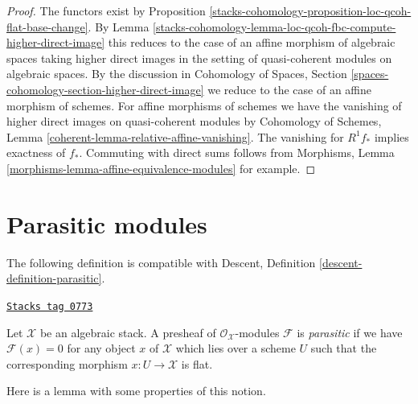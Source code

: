 \begin{proof}
The functors exist by Proposition \ref{stacks-cohomology-proposition-loc-qcoh-flat-base-change}.
By Lemma \ref{stacks-cohomology-lemma-loc-qcoh-fbc-compute-higher-direct-image}
this reduces to the case of an affine morphism of algebraic spaces
taking higher direct images in the setting of quasi-coherent
modules on algebraic spaces. By the discussion in
Cohomology of Spaces, Section
\ref{spaces-cohomology-section-higher-direct-image}
we reduce to the case of an affine morphism of schemes.
For affine morphisms of schemes we have the vanishing of
higher direct images on quasi-coherent modules by
Cohomology of Schemes, Lemma \ref{coherent-lemma-relative-affine-vanishing}.
The vanishing for $R^1f_*$ implies exactness of $f_*$.
Commuting with direct sums follows from
Morphisms, Lemma \ref{morphisms-lemma-affine-equivalence-modules}
for example.
\end{proof}

\section{Parasitic modules}
\label{stacks-cohomology-section-parasitic}
The following definition is compatible with
Descent, Definition \ref{descent-definition-parasitic}.

\begin{definition}[Parasitic]
\label{stacks-cohomology-definition-parasitic}
\href{https://stacks.math.columbia.edu/tag/0773}{\texttt{Stacks tag 0773}}

Let $\mathcal{X}$ be an algebraic stack.
A presheaf of $\mathcal{O}_\mathcal{X}$-modules $\mathcal{F}$ is
{\it parasitic} if we have $\mathcal{F}(x) = 0$ for any object $x$
of $\mathcal{X}$ which lies over a scheme $U$ such that the corresponding
morphism $x : U \to \mathcal{X}$ is flat.
\end{definition}

Here is a lemma with some properties of this notion.

